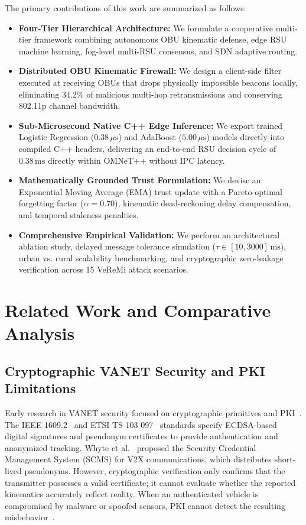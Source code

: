 \documentclass[conference]{IEEEtran}
\begin{document}
The primary contributions of this work are summarized as follows:
\begin{itemize}
    \item \textbf{Four-Tier Hierarchical Architecture:} We formulate a cooperative multi-tier framework combining autonomous OBU kinematic defense, edge RSU machine learning, fog-level multi-RSU consensus, and SDN adaptive routing.
    \item \textbf{Distributed OBU Kinematic Firewall:} We design a client-side filter executed at receiving OBUs that drops physically impossible beacons locally, eliminating 34.2\% of malicious multi-hop retransmissions and conserving 802.11p channel bandwidth.
    \item \textbf{Sub-Microsecond Native C++ Edge Inference:} We export trained Logistic Regression ($0.38\,\mu\text{s}$) and AdaBoost ($5.00\,\mu\text{s}$) models directly into compiled C++ headers, delivering an end-to-end RSU decision cycle of $0.38\,\text{ms}$ directly within OMNeT++ without IPC latency.
    \item \textbf{Mathematically Grounded Trust Formulation:} We devise an Exponential Moving Average (EMA) trust update with a Pareto-optimal forgetting factor ($\alpha=0.70$), kinematic dead-reckoning delay compensation, and temporal staleness penalties.
    \item \textbf{Comprehensive Empirical Validation:} We perform an architectural ablation study, delayed message tolerance simulation ($\tau \in [10, 3000]\,\text{ms}$), urban vs. rural scalability benchmarking, and cryptographic zero-leakage verification across 15 VeReMi attack scenarios.
\end{itemize}


\section{Related Work and Comparative Analysis}

\subsection{Cryptographic VANET Security and PKI Limitations}
Early research in VANET security focused on cryptographic primitives and PKI~\cite{raya, kargl2008secure}. The IEEE 1609.2~\cite{ieee16092} and ETSI TS 103 097~\cite{etsi103097} standards specify ECDSA-based digital signatures and pseudonym certificates to provide authentication and anonymized tracking. Whyte et al.~\cite{whyte2013security} proposed the Security Credential Management System (SCMS) for V2X communications, which distributes short-lived pseudonyms. However, cryptographic verification only confirms that the transmitter possesses a valid certificate; it cannot evaluate whether the reported kinematics accurately reflect reality. When an authenticated vehicle is compromised by malware or spoofed sensors, PKI cannot detect the resulting misbehavior~\cite{veremi}.
\end{document}
